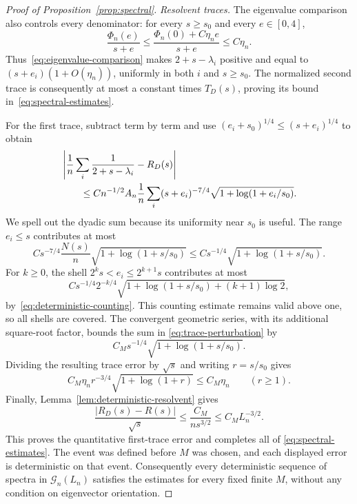 \begin{proof}[Proof of Proposition~\ref{prop:spectral}]
\smallskip\noindent\emph{Resolvent traces.}
The eigenvalue comparison also controls every denominator: for every
$s\ge s_0$ and every $e\in[0,4]$,
\begin{equation}
 \frac{\Phi_n(e)}{s+e}
 \le\frac{\Phi_n(0)+C\eta_ne}{s+e}
 \le C\eta_n.
 \label{eq:denominator-comparison}
\end{equation}
Thus~\eqref{eq:eigenvalue-comparison} makes
$2+s-\lambda_i$ positive and equal to $(s+e_i)(1+O(\eta_n))$,
uniformly in both $i$ and $s\ge s_0$.
The normalized second trace is consequently at most a constant times
$T_D(s)$, proving its bound in~\eqref{eq:spectral-estimates}.

For the first trace, subtract term by term and use
$(e_i+s_0)^{1/4}\le(s+e_i)^{1/4}$ to obtain
\begin{align}
 &\left|\frac1n\sum_i\frac1{2+s-\lambda_i}-R_D(s)\right|\notag\\
 &\qquad\le Cn^{-1/2}A_n\frac1n\sum_i
 (s+e_i)^{-7/4}\sqrt{1+\log(1+e_i/s_0)}.
 \label{eq:trace-perturbation}
\end{align}
We spell out the dyadic sum because its uniformity near $s_0$ is useful.
The range $e_i\le s$ contributes at most
\[
 Cs^{-7/4}\frac{N(s)}n\sqrt{1+\log(1+s/s_0)}
 \le Cs^{-1/4}\sqrt{1+\log(1+s/s_0)}.
\]
For $k\ge0$, the shell $2^ks<e_i\le2^{k+1}s$ contributes at most
\[
 Cs^{-1/4}2^{-k/4}
 \sqrt{1+\log(1+s/s_0)+(k+1)\log2},
\]
by~\eqref{eq:deterministic-counting}.  This counting estimate remains
valid above one, so all shells are covered.  The convergent geometric
series, with its additional square-root factor, bounds the sum in
\eqref{eq:trace-perturbation} by
\[
 C_Ms^{-1/4}\sqrt{1+\log(1+s/s_0)}.
\]
Dividing the resulting trace error by $\sqrt s$ and writing $r=s/s_0$
gives
\[
 C_M\eta_n r^{-3/4}\sqrt{1+\log(1+r)}\le C_M\eta_n
 \qquad(r\ge1).
\]
Finally, Lemma~\ref{lem:deterministic-resolvent} gives
\[
 \frac{|R_D(s)-R(s)|}{\sqrt s}
 \le\frac{C_M}{ns^{3/2}}\le C_ML_n^{-3/2}.
\]
This proves the quantitative first-trace error and completes all of
\eqref{eq:spectral-estimates}.  The event was defined before $M$ was
chosen, and each displayed error is deterministic on that event.
Consequently every deterministic sequence of spectra in
$\mathcal G_n(L_n)$ satisfies the estimates for every fixed finite $M$,
without any condition on eigenvector orientation.
\end{proof}
